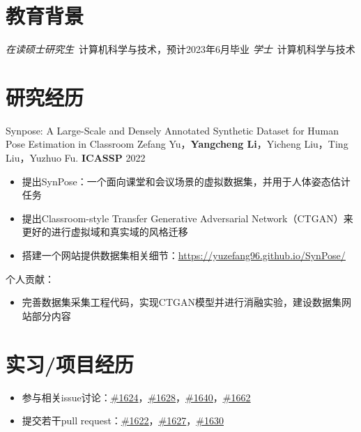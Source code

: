 \documentclass{resume}
\begin{document}


 
\section{教育背景}
\textit{在读硕士研究生}\ 计算机科学与技术，预计2023年6月毕业
\textit{学士}\ 计算机科学与技术

\section{研究经历}
Synpose: A Large-Scale and Densely Annotated Synthetic Dataset for Human Pose Estimation in Classroom
Zefang Yu，\textbf{Yangcheng Li}，Yicheng Liu，Ting Liu，Yuzhuo Fu. \textbf{ICASSP} 2022
\begin{itemize}
  \item 提出SynPose：一个面向课堂和会议场景的虚拟数据集，并用于人体姿态估计任务
  \item 提出Classroom-style Transfer Generative Adversarial Network（CTGAN）来更好的进行虚拟域和真实域的风格迁移
  \item 搭建一个网站提供数据集相关细节：{\underline{\url{https://yuzefang96.github.io/SynPose/}}}
\end{itemize}
个人贡献：
\begin{itemize}
  \item 完善数据集采集工程代码，实现CTGAN模型并进行消融实验，建设数据集网站部分内容
\end{itemize}

\section{实习/项目经历}
\begin{itemize}
  \item 参与相关issue讨论：{\underline{\href{https://github.com/open-mmlab/mmaction2/issues/1624}{\#1624}}}，{\underline{\href{https://github.com/open-mmlab/mmaction2/issues/1628}{\#1628}}}，{\underline{\href{https://github.com/open-mmlab/mmaction2/issues/1640}{\#1640}}}，{\underline{\href{https://github.com/open-mmlab/mmaction2/issues/1662}{\#1662}}}
  \item 提交若干pull request：{\underline{\href{https://github.com/open-mmlab/mmaction2/pull/1622}{\#1622}}}，{\underline{\href{https://github.com/open-mmlab/mmaction2/pull/1627}{\#1627}}}，{\underline{\href{https://github.com/open-mmlab/mmaction2/pull/1630}{\#1630}}}
\end{itemize}
\end{document}
